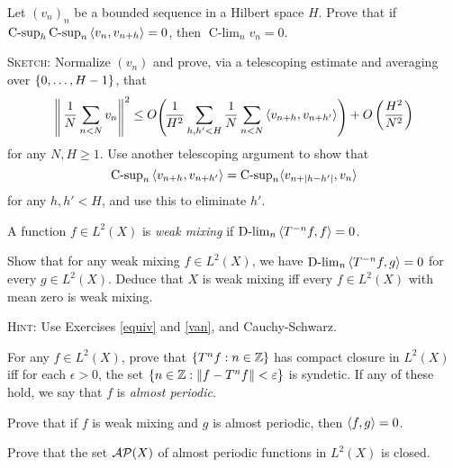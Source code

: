 \documentclass[reqno, twoside]{article}
\newcommand{\Clim}{\operatorname{C-lim}}
\newcommand{\Csup}{\operatorname{C-sup}}
\newcommand{\Dlim}{\operatorname{D-lim}}
\begin{document}
    \begin{exercise}\label{van}
        Let $(v_n)_n$ be a bounded sequence in a Hilbert space $H$. Prove that if $\Csup_h\Csup_n\l\langle v_n,v_{n+h}\r\rangle=0$, then $\Clim_nv_n=0$.

        \textsc{Sketch}: Normalize $(v_n)$ and prove, via a telescoping estimate and averaging over $\left\{0,\dots,H-1\right\}$, that
        \vspace{-0.05in}
        \begin{equation*}
            \raisebox{-2pt}{$\Biggl\|\,$}\frac{1}{N}\sum_{n<N}v_n\raisebox{-2pt}{$\Biggr\|$}^2\leq O\raisebox{-2pt}{$\Biggl(\!$}\frac{1}{H^2}\sum_{h,h'<H}\frac{1}{N}\sum_{n<N}\l\langle v_{n+h},v_{n+h'}\r\rangle\!\raisebox{-2pt}{$\Biggr)$}+O\l(\frac{H^2}{N^2}\r)
            \vspace{-0.05in}
        \end{equation*}
        for any $N,H\geq1$. Use another telescoping argument to show that
        \vspace{-0.05in}
        \begin{equation*}
            \Csup_n\l\langle v_{n+h},v_{n+h'}\r\rangle=\Csup_n\langle v_{n+|h-h'|},v_n\rangle
            \vspace{-0.05in}
        \end{equation*}
        for any $h,h'<H$, and use this to eliminate $h'$.
    \end{exercise}

    \begin{definition*}
        A function $f\in L^2(X)$ is \textit{weak mixing} if $\Dlim_n\l\langle T^{-n}f,f\r\rangle=0$.
    \end{definition*}

    \begin{exercise}
        Show that for any weak mixing $f\in L^2(X)$, we have $\Dlim_n\l\langle T^{-n}f,g\r\rangle=0$ for every $g\in L^2(X)$. Deduce that $X$ is weak mixing iff every $f\in L^2(X)$ with mean zero is weak mixing.

        \textsc{Hint:} Use Exercises \ref{equiv} and \ref{van}, and Cauchy-Schwarz.
    \end{exercise}

    \begin{exercise}
        For any $f\in L^2(X)$, prove that $\left\{T^nf: n\in\mathbb{Z}\right\}$ has compact closure in $L^2(X)$ iff for each $\epsilon>0$, the set $\left\{n\in\mathbb{Z}:\left\|f-T^nf\right\|<\varepsilon\right\}$ is syndetic. If any of these hold, we say that $f$ is \textit{almost periodic}.
    \end{exercise}

    \begin{exercise}
        Prove that if $f$ is weak mixing and $g$ is almost periodic, then $\left\langle f,g\right\rangle=0$.
    \end{exercise}

    \begin{exercise}
        Prove that the set $\mathcal{AP}(X)$ of almost periodic functions in $L^2(X)$ is closed.
    \end{exercise}
\end{document}
